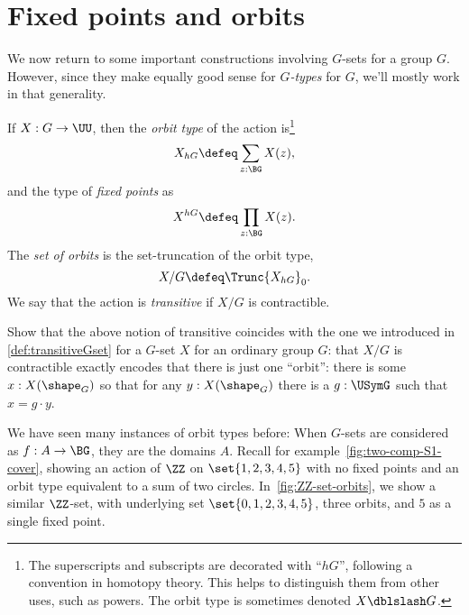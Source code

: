 \section{Fixed points and orbits}
\label{sec:fixpts-orbits}
We now return to some important constructions involving $G$-sets for a group $G$.
However, since they make equally good sense for \emph{$G$-types} for \aninftygp
$G$, we'll mostly work in that generality.
\begin{definition}
  \label{def:orbittype}
  If $X : G\to\UU$, then the \emph{orbit type}
  of the action is\footnote{%
    The superscripts and subscripts are decorated with ``$hG$'',
    following a convention in homotopy theory.
    This helps to distinguish them from other uses, such as powers.
    The orbit type is sometimes denoted $X \dblslash G$.}
\[
  X_{hG} \defeq \sum_{z:\BG} X(z),
\]
and the type of \emph{fixed points} as
\[
  X^{hG} \defeq \prod_{z:\BG} X(z).
\]
The \emph{set of orbits} is the set-truncation of the orbit type,
\[
  X / G \defeq \Trunc{X_{hG}}_0.
\]
We say that the action is \emph{transitive}
if $X / G$ is contractible.
\end{definition}

\begin{xca}
  Show that the above notion of transitive coincides with the one we introduced in \cref{def:transitiveGset} for a $G$-set $X$ for an ordinary group $G$:
  that $X/G$ is contractible exactly encodes that there is just one ``orbit'':
  there is some $x:X(\shape_G)$ so that for any $y:X(\shape_G)$
  there is a $g:\USymG$ such that $x=g\cdot y$.
\end{xca}

We have seen many instances of orbit types before:
When $G$-sets are considered as \coverings $f : A \to \BG$,
they are the domains $A$.
Recall for example~\cref{fig:two-comp-S1-cover},
showing an action of $\ZZ$ on $\set{1,2,3,4,5}$ with no fixed points
and an orbit type equivalent to a sum of two circles.
In~\cref{fig:ZZ-set-orbits}, we show a similar $\ZZ$-set,
with underlying set $\set{0,1,2,3,4,5}$, three orbits,
and $5$ as a single fixed point.

